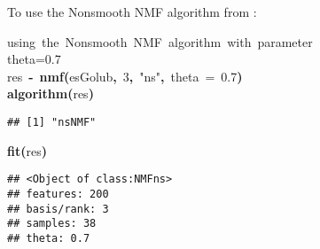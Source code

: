 \documentclass[a4paper]{article}\usepackage{graphicx, color}
\makeatletter
\newcommand{\hlnumber}[1]{\textcolor[rgb]{0,0,0}{#1}}%
\newcommand{\hlfunctioncall}[1]{\textcolor[rgb]{0.501960784313725,0,0.329411764705882}{\textbf{#1}}}%
\newcommand{\hlstring}[1]{\textcolor[rgb]{0.6,0.6,1}{#1}}%
\newcommand{\hlkeyword}[1]{\textcolor[rgb]{0,0,0}{\textbf{#1}}}%
\newcommand{\hlargument}[1]{\textcolor[rgb]{0.690196078431373,0.250980392156863,0.0196078431372549}{#1}}%
\newcommand{\hlcomment}[1]{\textcolor[rgb]{0.180392156862745,0.6,0.341176470588235}{#1}}%
\newcommand{\hlassignement}[1]{\textcolor[rgb]{0,0,0}{\textbf{#1}}}%
\newcommand{\hlsymbol}[1]{\textcolor[rgb]{0,0,0}{#1}}%
\newcommand{\hlstd}[1]{\textcolor[rgb]{0,0,0}{#1}}%
\newenvironment{kframe}{%
 \def\FrameCommand##1{\hskip\@totalleftmargin \hskip-\fboxsep
 \colorbox{shadecolor}{##1}\hskip-\fboxsep
     \hskip-\linewidth \hskip-\@totalleftmargin \hskip\columnwidth}%
 \MakeFramed {\advance\hsize-\width
   \@totalleftmargin\z@ \linewidth\hsize
   \@setminipage}}%
 {\par\unskip\endMakeFramed}
\newenvironment{knitrout}{}{} %
\makeatother
\begin{document}
To use the Nonsmooth NMF algorithm from \cite{Pascual-Montano2006}: 
\begin{knitrout}
\color{fgcolor}\begin{kframe}
\begin{flushleft}
\ttfamily\noindent
\hlcomment{\usebox{\hlnormalsizeboxhash}{\ }using{\ }the{\ }Nonsmooth{\ }NMF{\ }algorithm{\ }with{\ }parameter}\hspace*{\fill}\\
\hlstd{}\hlcomment{\usebox{\hlnormalsizeboxhash}{\ }theta=0.7}\hspace*{\fill}\\
\hlstd{}\hlsymbol{res}{\ }\hlassignement{\usebox{\hlnormalsizeboxlessthan}-}{\ }\hlfunctioncall{nmf}\hlkeyword{(}\hlsymbol{esGolub}\hlkeyword{,}{\ }\hlnumber{3}\hlkeyword{,}{\ }\hlstring{"{}ns"{}}\hlkeyword{,}{\ }\hlargument{theta}{\ }\hlargument{=}{\ }\hlnumber{0.7}\hlkeyword{)}\hspace*{\fill}\\
\hlstd{}\hlfunctioncall{algorithm}\hlkeyword{(}\hlsymbol{res}\hlkeyword{)}\mbox{}
\normalfont
\end{flushleft}
\begin{verbatim}
## [1] "nsNMF"
\end{verbatim}
\begin{flushleft}
\ttfamily\noindent
\hlfunctioncall{fit}\hlkeyword{(}\hlsymbol{res}\hlkeyword{)}\mbox{}
\normalfont
\end{flushleft}
\begin{verbatim}
## <Object of class:NMFns>
## features: 200 
## basis/rank: 3 
## samples: 38 
## theta: 0.7 
\end{verbatim}
\end{kframe}
\end{knitrout}
\end{document}
